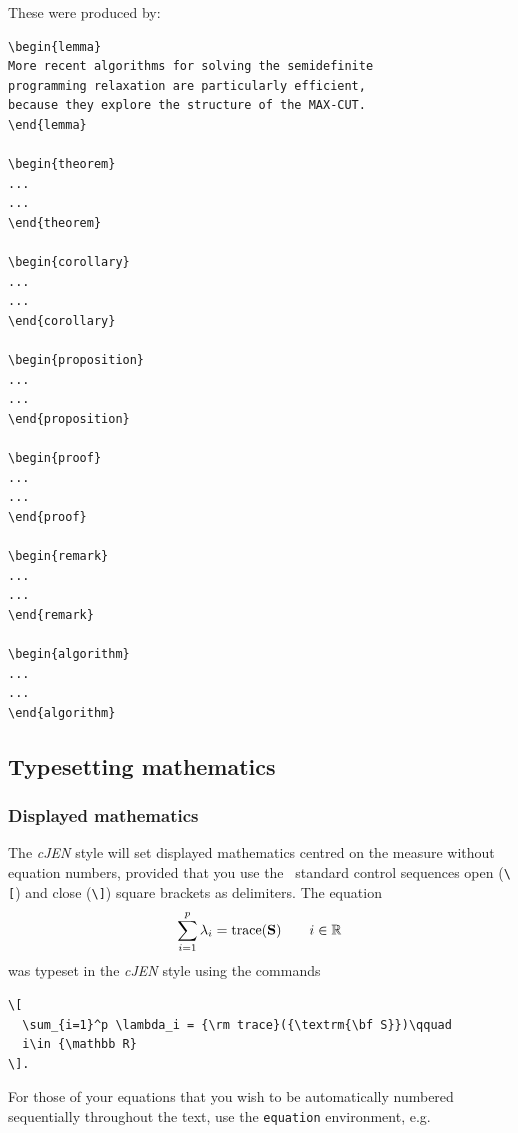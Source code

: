 \documentclass[]{cJEN2e}
\begin{document}
\noindent These were produced by:
\begin{verbatim}
\begin{lemma}
More recent algorithms for solving the semidefinite
programming relaxation are particularly efficient,
because they explore the structure of the MAX-CUT.
\end{lemma}

\begin{theorem}
...
...
\end{theorem}

\begin{corollary}
...
...
\end{corollary}

\begin{proposition}
...
...
\end{proposition}

\begin{proof}
...
...
\end{proof}

\begin{remark}
...
...
\end{remark}

\begin{algorithm}
...
...
\end{algorithm}

\end{verbatim}


\subsection{Typesetting mathematics}\label{TMth}

\subsubsection{Displayed mathematics}

The {\it cJEN} style will set displayed mathematics centred on the measure without equation numbers, provided
that you use the \LaTeXe\ standard control sequences open (\verb"\[") and close (\verb"\]") square brackets as
delimiters. The equation
\[
  \sum_{i=1}^p \lambda_i = {\rm trace}({\textrm{\bf S}})\qquad
  i\in {\mathbb R}
\]
\normalfont was typeset in the {\it cJEN} style using the commands
%
\begin{verbatim}
\[
  \sum_{i=1}^p \lambda_i = {\rm trace}({\textrm{\bf S}})\qquad
  i\in {\mathbb R}
\].
\end{verbatim}

For those of your equations that you wish to be automatically
numbered sequentially throughout the text, use the {\tt{equation}}
environment, e.g.
\end{document}
